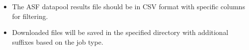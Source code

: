 \documentclass[letterpaper,10pt,english]{sphinxmanual}
\begin{document}
\begin{fulllineitems}
\begin{description}
\begin{itemize}
\item {} 
\sphinxAtStartPar
The ASF datapool results file should be in CSV format with specific columns for filtering.

\item {} 
\sphinxAtStartPar
Downloaded files will be saved in the specified directory with additional suffixes based on the job type.

\end{itemize}

\end{description}

\end{fulllineitems}

\end{document}
